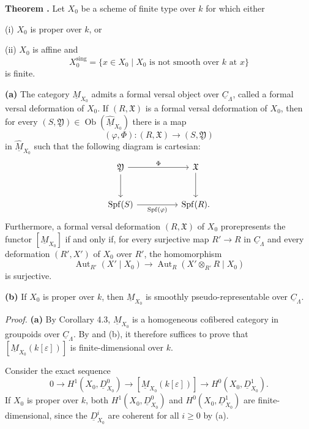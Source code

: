 
\medskip
\noindent\textbf{Theorem .}
Let $X_0$ be a scheme of finite type over $k$ for which either

\smallskip
\noindent(i) $X_0$ is proper over $k$, or

\noindent(ii) $X_0$ is affine and
\[
X_0^{\mathrm{sing}}
=\{x\in X_0\mid X_0\text{ is not smooth over }k\text{ at }x\}
\]
is finite.

\smallskip
\noindent\textbf{(a)}
The category $\underline M_{X_0}$ admits a formal versal object over
$\underline C_\Lambda$, called a formal versal deformation of $X_0$.
If $(R,\mathfrak X)$ is a formal versal deformation of $X_0$, then for
every $(S,\mathfrak Y)\in\operatorname{Ob}(\widehat{\underline M}_{X_0})$
there is a map
\[
(\varphi,\Phi):(R,\mathfrak X)\longrightarrow(S,\mathfrak Y)
\]
in $\widehat{\underline M}_{X_0}$ such that the following diagram is
cartesian:
\[
\begin{tikzcd}[column sep=huge,row sep=large]
\mathfrak Y \arrow[r,"\Phi"] \arrow[d]
& \mathfrak X \arrow[d] \\
\operatorname{Spf}(S)
 \arrow[r,"\operatorname{Spf}(\varphi)"']
& \operatorname{Spf}(R).
\end{tikzcd}
\]
Furthermore, a formal versal deformation $(R,\mathfrak X)$ of $X_0$
prorepresents the functor $[\underline M_{X_0}]$ if and only if, for
every surjective map $R'\longrightarrow R$ in $\underline C_\Lambda$
and every deformation $(R',X')$ of $X_0$ over $R'$, the homomorphism
\[
\operatorname{Aut}_{R'}(X'\mid X_0)
\longrightarrow
\operatorname{Aut}_R(X'\otimes_{R'}R\mid X_0)
\]
is surjective.

\smallskip
\noindent\textbf{(b)}
If $X_0$ is proper over $k$, then $\underline M_{X_0}$ is smoothly
pseudo-representable over $\underline C_\Lambda$.


\medskip
\noindent\textit{Proof.}
\textbf{(a)} By Corollary 4.3, $\underline M_{X_0}$ is a homogeneous
cofibered category in groupoids over $\underline C_\Lambda$. By 
and (b), it therefore suffices to prove that
$[\underline M_{X_0}(k[\varepsilon])]$ is finite-dimensional over
$k$.

Consider the exact sequence
\begin{equation}\tag{*}
0\longrightarrow H^1(X_0,\underline D^0_{X_0})
\longrightarrow[\underline M_{X_0}(k[\varepsilon])]
\longrightarrow H^0(X_0,\underline D^1_{X_0}).
\end{equation}
If $X_0$ is proper over $k$, both
$H^1(X_0,\underline D^0_{X_0})$ and
$H^0(X_0,\underline D^1_{X_0})$ are finite-dimensional, since the
$\underline D^i_{X_0}$ are coherent for all $i\geq0$ by (a).

